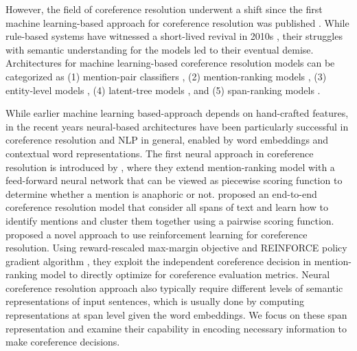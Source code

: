 \documentclass[11pt]{article}
\begin{document}
However, the field of coreference resolution underwent a shift since the first machine learning-based approach for coreference resolution was published \parencite{ConnollyEtAl:94}. While rule-based systems have witnessed a short-lived revival in 2010s \parencite{zhou2004, haghighi2009}, their struggles with semantic understanding for the models led to their eventual demise. Architectures for machine learning-based coreference resolution models can be categorized as (1) mention-pair classifiers \parencite{ng2002identifying,bengtson2008understanding}, (2) mention-ranking models \parencite{durrett2013easy,wiseman2015learning,clark2016deep,denis-baldridge-2008-specialized}, (3) entity-level models \parencite{haghighi-klein-2010-coreference,wiseman-etal-2016-learning,clark-manning-2015-entity,clark-manning-2016-improving}, (4) latent-tree models \parencite{fernandes-etal-2012-latent,martschat-strube-2015-latent,bjorkelund-kuhn-2014-learning}, and (5) span-ranking models \parencite{lee2017end,lee2018higher,joshi2019coref}.


While earlier machine learning based-approach depends on hand-crafted features, in the recent years neural-based architectures have been particularly successful in coreference resolution and NLP in general, enabled by word embeddings and contextual word representations. The first neural approach in coreference resolution is introduced by \parencite{wiseman2015learning}, where they extend mention-ranking model with a feed-forward neural network that can be viewed as piecewise scoring function to determine whether a mention is anaphoric or not. \parencite{lee2017end} proposed an end-to-end coreference resolution model that consider all spans of text and learn how to identify mentions and cluster them together using a pairwise scoring function. \parencite{clark2016deep} proposed a novel approach to use reinforcement learning for coreference resolution. Using reward-rescaled max-margin objective and REINFORCE policy gradient algorithm \parencite{reinforce}, they exploit the independent coreference decision in mention-ranking model to directly optimize for coreference evaluation metrics. Neural coreference resolution approach also typically require different levels of semantic representations of input sentences, which is usually done by computing representations at span level given the word embeddings. We focus on these span representation and examine their capability in encoding necessary information to make coreference decisions. 
\end{document}
